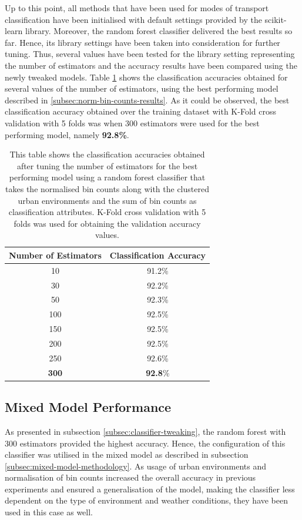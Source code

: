 \documentclass[bsc,frontabs,twoside,singlespacing, parskip,deptreport]{infthesis}     %
\begin{document}
Up to this point, all methods that have been used for modes of transport classification have been initialised with default settings provided by the scikit-learn library. Moreover, the random forest classifier delivered the best results so far. Hence, its library settings have been taken into consideration for further tuning. Thus, several values have been tested for the library setting representing the number of estimators and the accuracy results have been compared using the newly tweaked models. Table \ref{table:n-estimators} shows the classification accuracies obtained for several values of the number of estimators, using the best performing model described in \ref{subsec:norm-bin-counts-results}. As it could be observed, the best classification accuracy obtained over the training dataset with K-Fold cross validation with 5 folds was when 300 estimators were used for the best performing model, namely \textbf{92.8\%}.

\begin{table}[h!]
\centering
 \begin{tabular}{|| c | c ||} 
 \hline
 Number of Estimators & Classification Accuracy \\ [0.5ex] 
 \hline\hline
 10 & 91.2\% \\ 
 \hline
 30 & 92.2\% \\ 
 \hline
 50 & 92.3\% \\ 
 \hline
 100 & 92.5\% \\ 
 \hline
 150 & 92.5\% \\
 \hline
  200 & 92.5\% \\ 
 \hline
   250 & 92.6\% \\ 
 \hline
 \textbf{300} & \textbf{92.8}\% \\ 
 \hline
\end{tabular}
\caption{This table shows the classification accuracies obtained after tuning the number of estimators for the best performing model using a random forest classifier that takes the normalised bin counts along with the clustered urban environments and the sum of bin counts as classification attributes. K-Fold cross validation with 5 folds was used for obtaining the validation accuracy values.}
\label{table:n-estimators}
\end{table}


\subsection{Mixed Model Performance}

As presented in subsection \ref{subsec:classifier-tweaking}, the random forest with 300 estimators provided the highest accuracy. Hence, the configuration of this classifier was utilised in the mixed model as described in subsection \ref{subsec:mixed-model-methodology}. As usage of urban environments and normalisation of bin counts increased the overall accuracy in previous experiments and ensured a generalisation of the model, making the classifier less dependent on the type of environment and weather conditions, they have been used in this case as well. 
\end{document}
